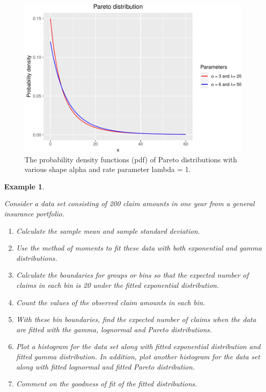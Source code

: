\documentclass[landscape, 20pt]{extreport}
\theoremstyle{definition}
\theoremstyle{definition}
\newtheorem{example}{Example}[chapter]
\theoremstyle{definition}
\theoremstyle{definition}
\theoremstyle{remark}
\begin{document}
\begin{figure}
\centering
\includegraphics{FigPareto-1.pdf}
\caption{\label{fig:FigPareto}The probability density functions (pdf) of Pareto distributions with various shape alpha and rate parameter lambda = 1.}
\end{figure}

\begin{example}
\protect\hypertarget{exm:exampleFittingClaimSizes}{}\label{exm:exampleFittingClaimSizes}

\emph{Consider a data set consisting of 200 claim amounts in
one year from a general insurance portfolio.}

\begin{enumerate}
\def\labelenumi{\arabic{enumi}.}
\item
  \emph{Calculate the sample mean and sample standard deviation.}
\item
  \emph{Use the method of moments to fit these data with both exponential
  and gamma distributions.}
\item
  \emph{Calculate the boundaries for groups or bins so that the expected
  number of claims in each bin is 20 under the fitted exponential
  distribution.}
\item
  \emph{Count the values of the observed claim amounts in each bin.}
\item
  \emph{With these bin boundaries, find the expected number of claims when
  the data are fitted with the gamma, lognormal and Pareto distributions.}
\item
  \emph{Plot a histogram for the data set along with fitted exponential
  distribution and fitted gamma distribution. In addition, plot another histogram for the data set along with fitted lognormal
  and fitted Pareto distribution.}
\item
  \emph{Comment on the goodness of fit of the fitted distributions.}
\end{enumerate}

\end{example}
\end{document}
